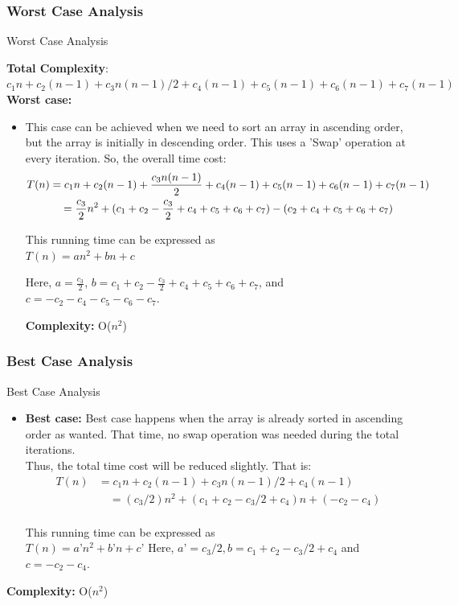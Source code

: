 \documentclass[aspectratio=169]{beamer}
\begin{document}
\subsubsection{Worst Case Analysis}
  \begin{frame}{Worst Case Analysis}
  
    \textbf{Total Complexity}: $c_1 n + c_2(n-1) + c_3n(n-1) / 2 + c_4(n-1) + c_5(n-1) + c_6(n-1) + c_7(n-1)$\\

    \textbf{Worst case:} 
\begin{itemize}

  \item  This case can be achieved when we need to sort an array in ascending order, but the array is initially in descending order. This uses a 'Swap' operation at every iteration.
 So, the overall time cost:
\begin{align*}\setlength{}{}
    T(n) &= c_1n + c_2(n-1) + \frac{c_3n(n-1)}{2} + c_4(n-1)+ c_5(n-1) + c_6(n-1) + c_7(n-1) \\
         &\quad= \frac{c_3}{2}n^2 + (c_1+c_2-\frac{c_3}{2}+c_4+c_5+c_6+c_7) - (c_2+c_4+c_5+c_6+c_7)
\end{align*}

This running time can be expressed as\\ $T(n) = an^2 + bn + c$

  Here, \( a = \frac{c_3}{2} \), \( b = c_1 + c_2 - \frac{c_3}{2} + c_4 + c_5 + c_6 + c_7 \), and \( c = -c_2 - c_4 - c_5 - c_6 - c_7 \).

    \textbf{Complexity:} O($n^2$)\\
\end{itemize}
\end{frame}

\subsubsection{Best Case Analysis}
\begin{frame}{Best Case Analysis}
    
    \begin{itemize}
  \item \textbf{Best case:} Best case happens when the array is already sorted in ascending order as wanted. That time, no swap operation was needed during the total iterations.\\
 Thus, the total time cost will be reduced slightly. That is:\\
 \begin{align*}
  T(n) & = c_1n + c_2(n-1) + c_3n(n-1) / 2 + c_4(n-1)\\
     &\quad= (c_3/2)n^2 + (c_1+c_2-c_3/2+c_4)n + (-c_2-c_4)\\
\end{align*}
   
       This running time can be expressed as \\
$T(n) = a’n^2 + b’n + c’$
Here, $a’ = c_3/2, b = c_1+c_2-c_3/2+c_4$ and $c = -c_2-c_4$.
  \end{itemize}
  \textbf{Complexity:} O($n^2$)

  \end{frame}
\end{document}
